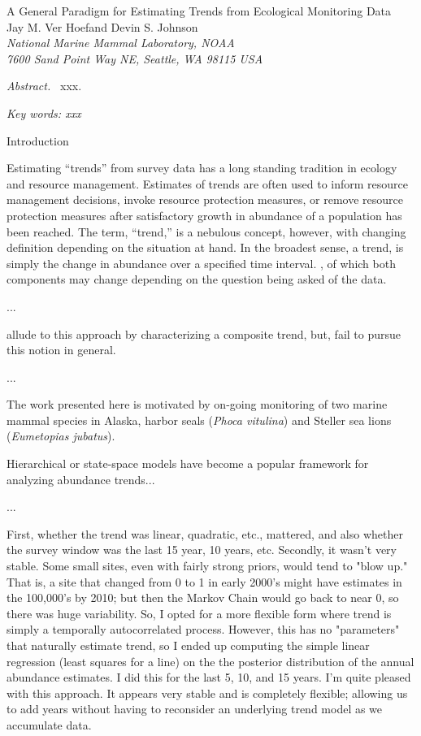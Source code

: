 \documentclass[12pt,letter,draft]{article}
\begin{document}
\begin{center}
\Large A General Paradigm for Estimating Trends from Ecological Monitoring Data
\bigskip\\
\normalsize
{\sc Jay M. Ver Hoef\footnotemark[1] and Devin S. Johnson}\smallskip\\
{\em National Marine Mammal Laboratory, NOAA\\
7600 Sand Point Way NE, Seattle,
WA 98115 USA }\\ \medskip
\end{center}

\raggedright \setlength{\parindent}{0.3in}
\renewcommand{\baselinestretch}{1.7}\normalsize
{}
 \linenumbers

{\em Abstract.\ } xxx.

{\em Key words: xxx}

\centerline{\sc Introduction}

Estimating ``trends'' from survey data has a long standing tradition in ecology and resource management. Estimates of trends are often used to inform resource management decisions, invoke resource protection measures, or remove resource protection measures after satisfactory growth in abundance of a population has been reached. The term, ``trend,'' is a nebulous concept, however, with changing definition depending on the situation at hand. In the broadest sense, a trend, is simply the change in abundance over a specified time interval. , of which both components may change depending on the question being asked of the data.   

...


\citet{Link:2002zd} allude to this approach by characterizing a composite trend, but, fail to pursue this notion in general.


...

The work presented here is motivated by on-going monitoring of two marine mammal species in Alaska, harbor seals ({\it Phoca vitulina}) and Steller sea lions ({\it Eumetopias jubatus}).

Hierarchical or state-space models have become a popular framework for analyzing abundance trends...

...

 First, whether the trend was linear, quadratic, etc., mattered, and also whether the survey window was the last 15 year, 10 years, etc.  Secondly, it wasn't very stable.  Some small sites, even with fairly strong priors, would tend to "blow up."  That is, a site that changed from 0 to 1 in early 2000's might have estimates in the 100,000's by 2010; but then the Markov Chain would go back to near 0, so there was huge variability.  So, I opted for a more flexible form where trend is simply a temporally autocorrelated process.  However, this has no "parameters" that naturally estimate trend, so I ended up computing the simple linear regression (least squares for a line) on the the posterior distribution of the annual abundance estimates.  I did this for the last 5, 10, and 15 years.  I'm quite pleased with this approach.  It appears very stable and is completely flexible; allowing us to add years without having to reconsider an underlying trend model as we accumulate data.
\end{document}
